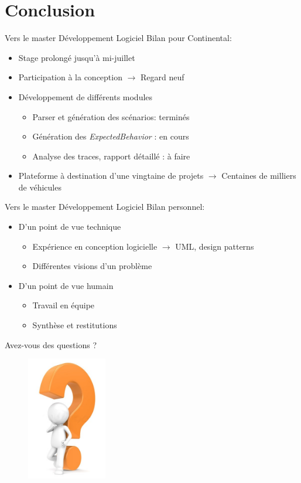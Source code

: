 \documentclass{beamer}
\begin{document}
\section*{Conclusion}
\begin{frame}{Vers le master Développement Logiciel}
		Bilan pour Continental:
	\vspace{-10px}
	\begin{itemize}[<+->]
			\item Stage prolongé jusqu'à mi-juillet
			\item Participation à la conception $\rightarrow$ Regard neuf
			\item Développement de différents modules 
				\begin{itemize}
					\item<3->Parser et génération des scénarios: terminés
					\item<3-> Génération des
						\textit{ExpectedBehavior} : en cours
					\item<3-> Analyse des traces, rapport détaillé : à faire
				\end{itemize}
			\item Plateforme à destination d'une vingtaine de
				projets\newline
				$\rightarrow$ Centaines de milliers de véhicules
		\end{itemize}
\end{frame}
\begin{frame}{Vers le master Développement Logiciel}
		\vfill
	Bilan personnel:
	\vspace{-10px}
		\begin{itemize}[<+->]
			\item D'un point de vue technique
				\begin{itemize}
					\item Expérience en conception logicielle
						\scriptsize
						\newline $\rightarrow$ UML, design patterns
					\item Différentes visions d'un problème
				\end{itemize}
		\vfill
			\item D'un point de vue humain
				\begin{itemize}
					\item Travail en équipe
					\item Synthèse et restitutions
				\end{itemize}
		\end{itemize}
		\vfill
\end{frame}
\begin{frame}{Avez-vous des questions ?}
	\begin{figure}[H]
		\centering
		\includegraphics[width=3.5cm]{interrogation.jpg}
	\end{figure}
\end{frame}
\end{document}
